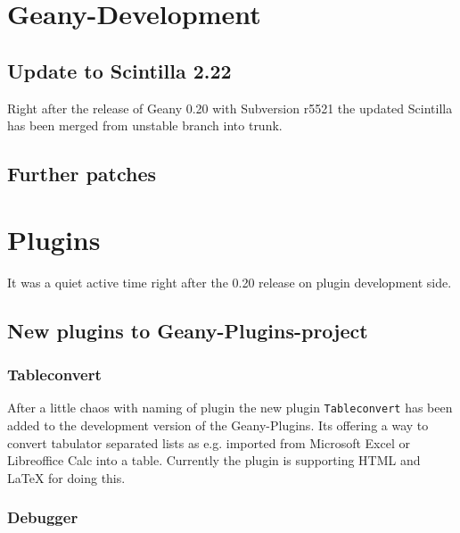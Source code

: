 \documentclass[%
paper=a4,%
fontsize=11pt,%
twoside=false,%
DIV18,
headsepline,
plainheadsepline,
footsepline,
plainfootsepline,
parskip=half,%
openany,%
]{scrartcl}
\begin{document}
\section{Geany-Development}
\subsection{Update to Scintilla 2.22}

Right after the release of Geany 0.20 with Subversion r5521 the
updated Scintilla has been merged from unstable branch into trunk.

\subsection{Further patches}

\section{Plugins}

It was a quiet active time right after the 0.20 release on plugin
development side.


\subsection{New plugins to Geany-Plugins-project}
\subsubsection{Tableconvert}

After a little chaos with naming of plugin the new plugin \texttt{Tableconvert}
has been added to the development version of the Geany-Plugins. Its
offering a way to convert tabulator separated lists as e.g. imported
from Microsoft Excel or Libreoffice Calc into a table. Currently the
plugin is supporting HTML and \LaTeX{} for doing this.

\subsubsection{Debugger}
\end{document}
